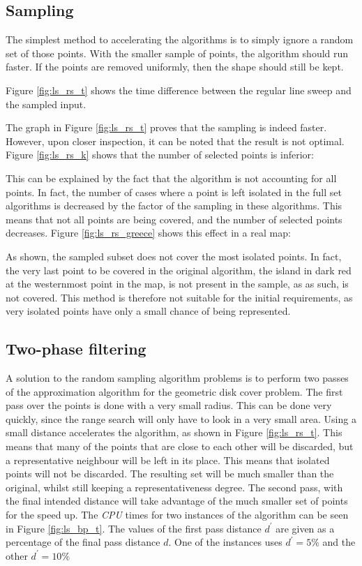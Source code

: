 \subsection{Sampling}
The simplest method to accelerating the algorithms is to simply ignore a random set of those points. With the smaller sample of points, the algorithm should run faster. If the points are removed uniformly, then the shape should still be kept.

Figure \ref{fig:ls_rs_t} shows the time difference between the regular line sweep and the sampled input.



The graph in Figure \ref{fig:ls_rs_t} proves that the sampling is indeed faster. However, upon closer inspection, it can be noted that the result is not optimal. Figure \ref{fig:ls_rs_k} shows that the number of selected points is inferior:



This can be explained by the fact that the algorithm is not accounting for all points. In fact, the number of cases where a point is left isolated in the full set algorithms is decreased by the factor of the sampling in these algorithms. This means that not all points are being covered, and the number of selected points decreases. Figure \ref{fig:ls_rs_greece} shows this effect in a real map:



As shown, the sampled subset does not cover the most isolated points. In fact, the very last point to be covered in the original algorithm, the island in dark red at the westernmost point in the map, is not present in the sample, as as such, is not covered. This method is therefore not suitable for the initial requirements, as very isolated points have only a small chance of being represented.

\subsection{Two-phase filtering}
A solution to the random sampling algorithm problems is to perform two passes of the approximation algorithm for the geometric disk cover problem. The first pass over the points is done with a very small radius. This can be done very quickly, since the range search will only have to look in a very small area. Using a small distance accelerates the algorithm, as shown in Figure \ref{fig:ls_rs_t}. This means that many of the points that are close to each other will be discarded, but a representative neighbour will be left in its place. This means that isolated points will not be discarded. The resulting set will be much smaller than the original, whilst still keeping a representativeness degree. The second pass, with the final intended distance will take advantage of the much smaller set of points for the speed up. The \emph{CPU} times for two instances of the algorithm can be seen in Figure \ref{fig:ls_bp_t}. The values of the first pass distance $d^\prime$ are given as a percentage of the final pass distance $d$. One of the instances uses $d^\prime=5\%$ and the other $d^\prime=10\%$

